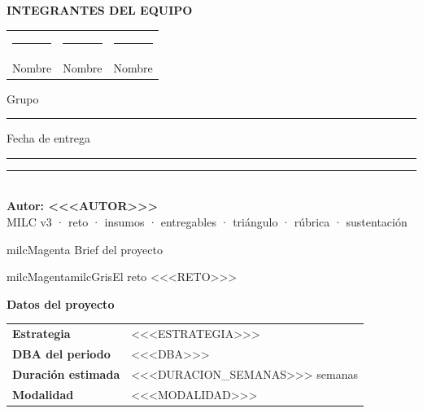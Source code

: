 \documentclass[11pt,letterpaper]{article}
\newcommand{\linead}[1]{\noindent\color{milcLinea}\rule{#1}{0.6pt}\color{milcNegro}}
\begin{document}
\vspace{6mm}

\begin{tcolorbox}[enhanced,colback=milcGris,colframe=milcGris,arc=2mm,boxrule=0pt,
  left=5mm,right=5mm,top=3.5mm,bottom=3.5mm]
{\sffamily\bfseries\fontsize{8}{10}\selectfont\textcolor{milcNegro!55}{INTEGRANTES DEL EQUIPO}}\\[3mm]
\begin{tabularx}{\linewidth}{XXX}
\linead{\linewidth} & \linead{\linewidth} & \linead{\linewidth}\\[-1mm]
{\fontsize{8.5}{10}\selectfont\textcolor{milcNegro!55}{Nombre}} &
{\fontsize{8.5}{10}\selectfont\textcolor{milcNegro!55}{Nombre}} &
{\fontsize{8.5}{10}\selectfont\textcolor{milcNegro!55}{Nombre}}\\[3mm]
\end{tabularx}
{\fontsize{8.5}{10}\selectfont\textcolor{milcNegro!55}{Grupo}}\quad\linead{3.5cm}\quad
{\fontsize{8.5}{10}\selectfont\textcolor{milcNegro!55}{Fecha de entrega}}\quad\linead{3.5cm}
\end{tcolorbox}

\vfill

\noindent\textcolor{milcLinea}{\rule{\linewidth}{1pt}}\\[2mm]
{\sffamily\bfseries\fontsize{9.5}{12}\selectfont Autor: <<<AUTOR>>>}\\[1mm]
{\sffamily\fontsize{8.5}{11}\selectfont\textcolor{milcNegro!55}{MILC v3 · reto · insumos · entregables · triángulo · rúbrica · sustentación}}


\newpage
\begin{titlebox}{milcMagenta}
Brief del proyecto
\end{titlebox}

\begin{softbox}{milcMagenta}{milcGris}{El reto}
<<<RETO>>>
\end{softbox}

\textbf{Datos del proyecto}\\[2mm]
\begin{tabularx}{\textwidth}{>{\bfseries}p{3.4cm}X}
\rowcolor{milcMagenta!12}Estrategia & <<<ESTRATEGIA>>>\\
DBA del periodo & <<<DBA>>>\\
Duración estimada & <<<DURACION_SEMANAS>>> semanas\\
Modalidad & <<<MODALIDAD>>>\\
\end{tabularx}
\end{document}
